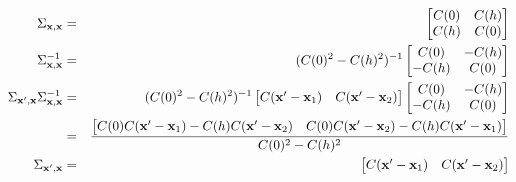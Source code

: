\begin{eqnarray*}
\Sigma_{\mathbf{x},\mathbf{x}}&=&
    \begin{bmatrix}C(0)&C(h)\\C(h)&C(0)\end{bmatrix}\\
\Sigma_{\mathbf{x},\mathbf{x}}^{-1}&=&
    (C(0)^2-C(h)^2)^{-1}\begin{bmatrix}C(0)&-C(h)\\-C(h)&C(0)\end{bmatrix}\\
\Sigma_{\mathbf{x}',\mathbf{x}}\Sigma_{\mathbf{x},\mathbf{x}}^{-1}
    &=&(C(0)^2-C(h)^2)^{-1}
        \begin{bmatrix}C(\mathbf{x}'-\mathbf{x}_1)&C(\mathbf{x}'-\mathbf{x}_2)\end{bmatrix}\begin{bmatrix}C(0)&-C(h)\\-C(h)&C(0)\end{bmatrix}\\
    &=&\frac{\begin{bmatrix}
        C(0)C(\mathbf{x}'-\mathbf{x}_1)-C(h)C(\mathbf{x}'-\mathbf{x}_2)&              C(0)C(\mathbf{x}'-\mathbf{x}_2)-C(h)C(\mathbf{x}'-\mathbf{x}_1)\end{bmatrix}}{C(0)^2-C(h)^2}\\
\Sigma_{\mathbf{x}',\mathbf{x}}&=&\begin{bmatrix}C(\mathbf{x}'-\mathbf{x}_1)&C(\mathbf{x}'-\mathbf{x}_2)\end{bmatrix}
\end{eqnarray*}



